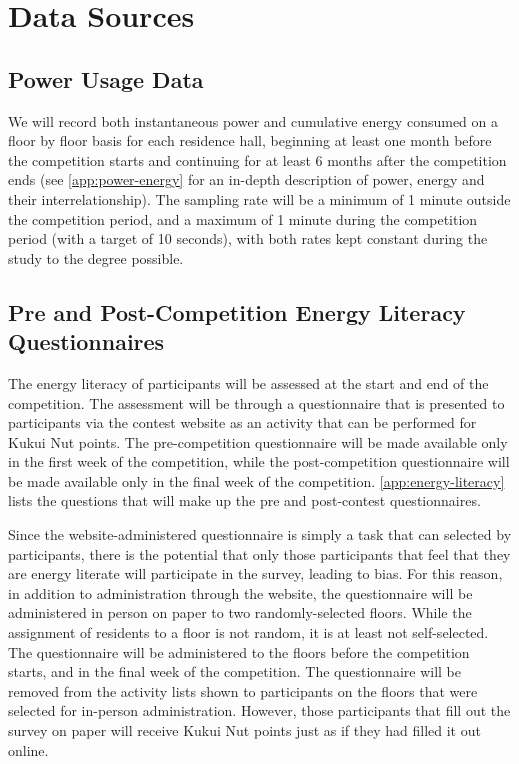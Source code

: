 \section{Data Sources}

\subsection{Power Usage Data}
\label{sec:power-usage-data}

We will record both instantaneous power and cumulative energy consumed on a floor by floor basis for each residence hall, beginning at least one month before the competition starts and continuing for at least 6 months after the competition ends (see \autoref{app:power-energy} for an in-depth description of power, energy and their interrelationship). The sampling rate will be a minimum of 1 minute outside the competition period, and a maximum of 1 minute during the competition period (with a target of 10 seconds), with both rates kept constant during the study to the degree possible.

\subsection{Pre and Post-Competition Energy Literacy Questionnaires}
\label{sec:exp-literacy-questionnaire}

The energy literacy of participants will be assessed at the start and end of the competition. The assessment will be through a questionnaire that is presented to participants via the contest website as an activity that can be performed for Kukui Nut points. The pre-competition questionnaire will be made available only in the first week of the competition, while the post-competition questionnaire will be made available only in the final week of the competition. \autoref{app:energy-literacy} lists the questions that will make up the pre and post-contest questionnaires.

Since the website-administered questionnaire is simply a task that can selected by participants, there is the potential that only those participants that feel that they are energy literate will participate in the survey, leading to bias. For this reason, in addition to administration through the website, the questionnaire will be administered in person on paper to two randomly-selected floors. While the assignment of residents to a floor is not random, it is at least not self-selected. The questionnaire will be administered to the floors before the competition starts, and in the final week of the competition. The questionnaire will be removed from the activity lists shown to participants on the floors that were selected for in-person administration. However, those participants that fill out the survey on paper will receive Kukui Nut points just as if they had filled it out online.

